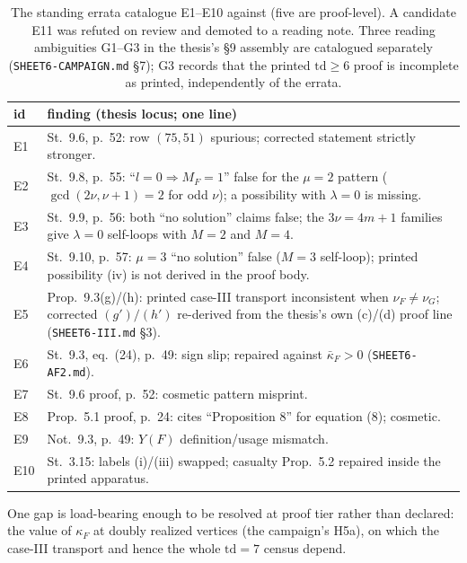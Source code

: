 \documentclass[11pt]{article}
\theoremstyle{definition}
\theoremstyle{remark}
\newcommand{\kb}{\bar\kappa}
\begin{document}
\begin{table}[ht]
\centering\small
\begin{tabular}{lp{}}
\toprule
id & finding (thesis locus; one line)\\
\midrule
E1 & St.~9.6, p.~52: row $(75,51)$ spurious; corrected statement strictly stronger.\\
E2 & St.~9.8, p.~55: ``$l=0\Rightarrow M_F=1$'' false for the $\mu=2$ pattern ($\gcd(2\nu,\nu+1)=2$ for odd $\nu$); a possibility with $\lambda=0$ is missing.\\
E3 & St.~9.9, p.~56: both ``no solution'' claims false; the $3\nu=4m+1$ families give $\lambda=0$ self-loops with $M=2$ and $M=4$.\\
E4 & St.~9.10, p.~57: $\mu=3$ ``no solution'' false ($M=3$ self-loop); printed possibility (iv) is not derived in the proof body.\\
E5 & Prop.~9.3(g)/(h): printed case-III transport inconsistent when $\nu_F\neq\nu_G$; corrected $(g')/(h')$ re-derived from the thesis's own (c)/(d) proof line (\texttt{SHEET6-III.md} \S3).\\
E6 & St.~9.3, eq.~(24), p.~49: sign slip; repaired against $\kb_F>0$ (\texttt{SHEET6-AF2.md}).\\
E7 & St.~9.6 proof, p.~52: cosmetic pattern misprint.\\
E8 & Prop.~5.1 proof, p.~24: cites ``Proposition 8'' for equation (8); cosmetic.\\
E9 & Not.~9.3, p.~49: $Y(F)$ definition/usage mismatch.\\
E10 & St.~3.15: labels (i)/(iii) swapped; casualty Prop.~5.2 repaired inside the printed apparatus.\\
\bottomrule
\end{tabular}
\caption{The standing errata catalogue E1--E10 against \cite{Sigray} (five are proof-level). A candidate E11 was refuted on review and demoted to a reading note. Three reading ambiguities G1--G3 in the thesis's \S9 assembly are catalogued separately (\texttt{SHEET6-CAMPAIGN.md} \S7); G3 records that the printed $\mathrm{td}\geq 6$ proof is incomplete as printed, independently of the errata.}
\label{tab:errata}
\end{table}

One gap is load-bearing enough to be resolved at proof tier rather than declared: the value of $\kappa_F$ at doubly realized vertices (the campaign's H5a), on which the case-III transport and hence the whole $\mathrm{td}=7$ census depend.
\end{document}
